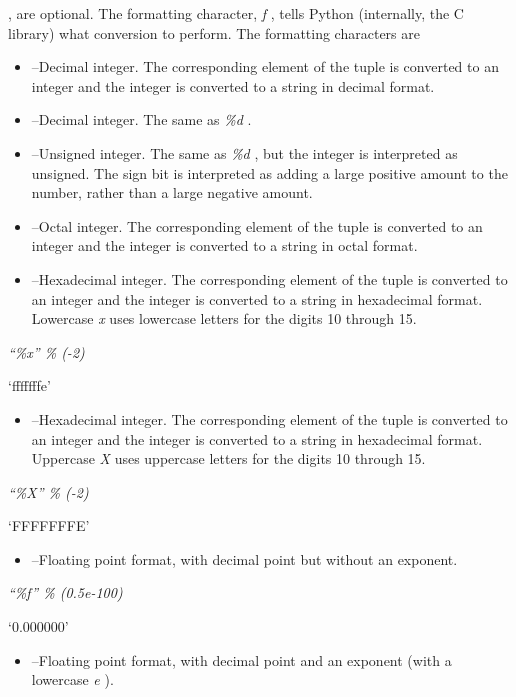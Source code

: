  , are
optional. The formatting character, \emph{f} , tells Python (internally,
the C library) what conversion to perform. The formatting characters are

\begin{itemize}

\item
   --Decimal integer. The
  corresponding element of the tuple is converted to an integer and the
  integer is converted to a string in decimal format.
\item
   --Decimal integer. The
  same as \emph{\%d} .
\item
   --Unsigned integer. The
  same as \emph{\%d} , but the integer is interpreted as unsigned. The
  sign bit is interpreted as adding a large positive amount to the
  number, rather than a large negative amount.
\item
   --Octal integer. The
  corresponding element of the tuple is converted to an integer and the
  integer is converted to a string in octal format.
\item
   --Hexadecimal integer.
  The corresponding element of the tuple is converted to an integer and
  the integer is converted to a string in hexadecimal format. Lowercase
  \emph{x} uses lowercase letters for the digits 10 through 15.
\end{itemize}


\emph{``\%x'' \% (-2)}

`fffffffe'

\begin{itemize}

\item
   --Hexadecimal integer.
  The corresponding element of the tuple is converted to an integer and
  the integer is converted to a string in hexadecimal format. Uppercase
  \emph{X} uses uppercase letters for the digits 10 through 15.
\end{itemize}


\emph{``\%X'' \% (-2)}

`FFFFFFFE'

\begin{itemize}

\item
   --Floating point
  format, with decimal point but without an exponent.
\end{itemize}


\emph{``\%f'' \% (0.5e-100)}

`0.000000'

\begin{itemize}

\item
   --Floating point
  format, with decimal point and an exponent (with a lowercase \emph{e}
  ).
\end{itemize}


